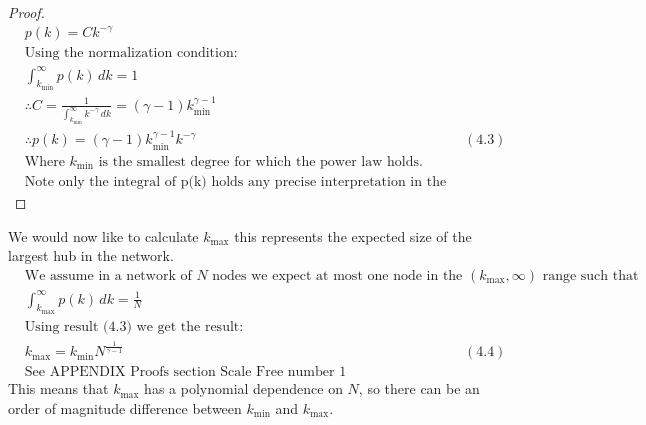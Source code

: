 \documentclass{article}
\begin{document}
\begin{proof}
\begin{align*}
                    &p(k) = Ck^{-\gamma}\\
                    &\text{Using the normalization condition:}\\
                    &\int_{k_{\text{min}}}^{\infty}p(k) \,dk = 1\\
                    &\therefore C = \frac{1}{\int_{k_{\text{min}}}^{\infty}k^{-\gamma} \,dk} = (\gamma -1)k_{\text{min}}^{\gamma-1}\\
                    &\therefore p(k) = (\gamma -1)k_{\text{min}}^{\gamma-1}k^{-\gamma}  &(4.3)\\
                    &\text{Where $k_{\text{min}}$ is the smallest degree for which the power law holds.}\\
                    &\text{Note only the integral of p(k) holds any precise interpretation in the continuum formalism}
                \end{align*}
            \end{proof}
            We would now like to calculate $k_{\text{max}}$ this represents the expected size of the largest hub in the network.
            \begin{align*}
                &\text{We assume in a network of $N$ nodes we expect at most one node in the $(k_{\text{max}},\infty)$ range such that}\\
                &\int_{k_{\text{max}}}^{\infty}p(k) \,dk = \frac{1}{N}\\
                &\text{Using result (4.3) we get the result:}\\
                &k_{\text{max}} = k_{\text{min}}N^{\frac{1}{\gamma -1}} &(4.4)\\
                &\text{See APPENDIX Proofs section Scale Free number 1 }
            \end{align*}
            This means that $k_{\text{max}}$ has a polynomial dependence on $N$, so there can be an order of magnitude difference between $k_{\text{min}}$ and $k_{\text{max}}$.\\
\end{document}

